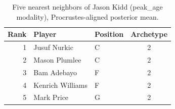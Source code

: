 \begin{table}[htbp]
  \centering\small
  \begin{tabular}{rllc}
    \toprule
    Rank & Player & Position & Archetype \\
    \midrule
    1 & Jusuf Nurkic & C & 2 \\
    2 & Mason Plumlee & C & 2 \\
    3 & Bam Adebayo & F & 2 \\
    4 & Kenrich Williams & F & 2 \\
    5 & Mark Price & G & 2 \\
    \bottomrule
  \end{tabular}
  \caption{Five nearest neighbors of Jason Kidd (peak_age modality), Procrustes-aligned posterior mean.}
  \label{tab:Jason_Kidd_neighbors_peak_age}
\end{table}


